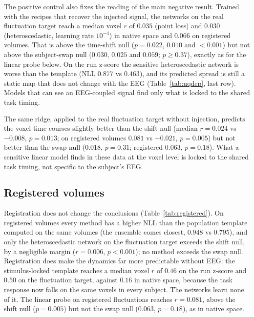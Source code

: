 The positive control also fixes the reading of the main negative result. Trained with the recipes that recover the injected signal, the networks on the real fluctuation target reach a median voxel $r$ of $0.035$ (point loss) and $0.030$ (heteroscedastic, learning rate $10^{-4}$) in native space and $0.066$ on registered volumes. That is above the time-shift null ($p=0.022$, $0.010$ and $<0.001$) but not above the subject-swap null ($0.030$, $0.025$ and $0.059$; $p\ge0.37$), exactly as for the linear probe below. On the run z-score the sensitive heteroscedastic network is worse than the template (NLL $0.877$ vs $0.463$), and its predicted spread is still a static map that does not change with the EEG (Table~\ref{tab:uqdep}, last row). Models that can see an EEG-coupled signal find only what is locked to the shared task timing.

The same ridge, applied to the real fluctuation target without injection, predicts the voxel time courses slightly better than the shift null (median $r=0.024$ vs $-0.008$, $p=0.013$; on registered volumes $0.081$ vs $-0.021$, $p=0.005$) but not better than the swap null ($0.018$, $p=0.31$; registered $0.063$, $p=0.18$). What a sensitive linear model finds in these data at the voxel level is locked to the shared task timing, not specific to the subject's EEG.

\subsection{Registered volumes}\label{sec:res:registered}
Registration does not change the conclusions (Table~\ref{tab:registered}). On registered volumes every method has a higher NLL than the population template computed on the same volumes (the ensemble comes closest, $0.948$ vs $0.795$), and only the heteroscedastic network on the fluctuation target exceeds the shift null, by a negligible margin ($r=0.006$, $p<0.001$); no method exceeds the swap null. Registration does make the dynamics far more predictable without EEG: the stimulus-locked template reaches a median voxel $r$ of $0.46$ on the run z-score and $0.50$ on the fluctuation target, against $0.16$ in native space, because the task response now falls on the same voxels in every subject. The networks learn none of it. The linear probe on registered fluctuations reaches $r=0.081$, above the shift null ($p=0.005$) but not the swap null ($0.063$, $p=0.18$), as in native space.

